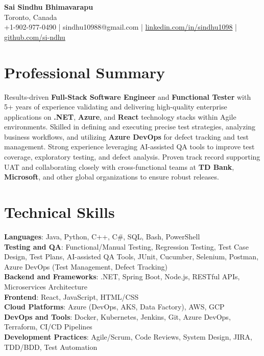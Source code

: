 \documentclass[letterpaper,11pt]{article}
\begin{document}
\begin{center}
  {\Large \textbf{Sai Sindhu Bhimavarapu}} \\
  Toronto, Canada \\
  +1-902-977-0490 \enspace | \enspace sindhu10988@gmail.com \enspace | \enspace \href{https://www.linkedin.com/in/sindhu1098/}{linkedin.com/in/sindhu1098} \enspace | \enspace \href{https://github.com/si-ndhu}{github.com/si-ndhu}
\end{center}

\section{Professional Summary}
  \begin{itemize}[leftmargin=0.15in, label={}]
    \small{\item{
     Results-driven \textbf{Full-Stack Software Engineer} and \textbf{Functional Tester} with 5+ years of experience validating and delivering high-quality enterprise applications on \textbf{.NET}, \textbf{Azure}, and \textbf{React} technology stacks within Agile environments. Skilled in defining and executing precise test strategies, analyzing business workflows, and utilizing \textbf{Azure DevOps} for defect tracking and test management. Strong experience leveraging AI-assisted QA tools to improve test coverage, exploratory testing, and defect analysis. Proven track record supporting UAT and collaborating closely with cross-functional teams at \textbf{TD Bank}, \textbf{Microsoft}, and other global organizations to ensure robust releases.
    }}
  \end{itemize}
\vspace{-16pt}

\section{Technical Skills}
 \begin{itemize}[leftmargin=0.15in, label={}]
    \small{\item{
     \textbf{Languages}: Java, Python, C++, C\#, SQL, Bash, PowerShell \\
     \textbf{Testing and QA}: Functional/Manual Testing, Regression Testing, Test Case Design, Test Plans, AI-assisted QA Tools, JUnit, Cucumber, Selenium, Postman, Azure DevOps (Test Management, Defect Tracking) \\
     \textbf{Backend and Frameworks}: .NET, Spring Boot, Node.js, RESTful APIs, Microservices Architecture \\
     \textbf{Frontend}: React, JavaScript, HTML/CSS \\
     \textbf{Cloud Platforms}: Azure (DevOps, AKS, Data Factory), AWS, GCP \\
     \textbf{DevOps and Tools}: Docker, Kubernetes, Jenkins, Git, Azure DevOps, Terraform, CI/CD Pipelines \\
     \textbf{Development Practices}: Agile/Scrum, Code Reviews, System Design, JIRA, TDD/BDD, Test Automation
    }}
 \end{itemize}
\vspace{-16pt}
\end{document}
